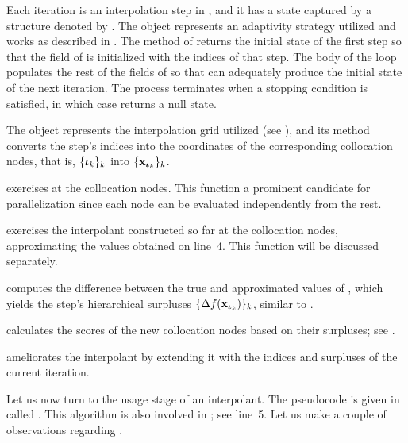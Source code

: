 \begin{compactlist}

 Each iteration is an interpolation step in ,
and it has a state captured by a structure denoted by . The
 object represents an adaptivity strategy utilized and works as
described in . The  method of 
returns the initial state of the first step so that the  field of
 is initialized with the indices of that step. The body of the loop
populates the rest of the fields of  so that  can
adequately produce the initial state of the next iteration. The process
terminates when a stopping condition is satisfied, in which case 
returns a null state.

 The  object represents the interpolation grid
utilized (see ), and its  method converts
the step's indices into the coordinates of the corresponding collocation nodes,
that is, $\{ {\bm{\iota}}_k \}_k$ into $\{ \mathbf{x}_{{\bm{\iota}}_k} \}_k$.

  exercises  at the collocation
nodes. This function a prominent candidate for parallelization since each node
can be evaluated independently from the rest.

  exercises the interpolant constructed so far at
the collocation nodes, approximating the values obtained on line~4. This
function will be discussed separately.

  computes the difference between the true and
approximated values of , which yields the step's hierarchical
surpluses $\{ \Delta f(\mathbf{x}_{{\bm{\iota}}_k}) \}_k$, similar to .

  calculates the scores of the new
collocation nodes based on their surpluses; see .

  ameliorates the interpolant by extending it with
the indices and surpluses of the current iteration.

\end{compactlist}


Let us now turn to the usage stage of an interpolant. The pseudocode is given in
 called . This algorithm is also involved in
; see line~5. Let us make a couple of observations regarding
.


